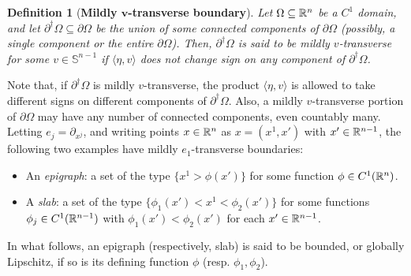 \documentclass[10 pt,a4paper]{article}
\newtheorem{definition}{Definition}
\theoremstyle{definition}
\begin{document}
\begin{definition}[\textbf{Mildly $\mathbf{v}$-transverse boundary}]\label{def_mildlytransv}
	Let $\Omega \subseteq \mathbb R^n$ be a $C^1$ domain, and let $\partial^\dagger\Omega \subseteq \partial \Omega$ be the union of some connected components of $\partial \Omega$ (possibly, a single component or the entire $\partial \Omega$). Then, $\partial^\dagger \Omega$ is said to be \emph{mildly $v$-transverse} for some $v \in \mathbb{S}^{n-1}$ if $\langle \eta,v \rangle$ does not change sign on any component of $\partial^\dagger\Omega$.
\end{definition}

Note that, if $\partial^\dagger \Omega$ is mildly $v$-transverse, the product $\langle \eta,v \rangle$ is allowed to take different signs on different components of $\partial^\dagger \Omega$. Also, a mildly $v$-transverse portion of $\partial\Omega$ may have any number of connected components, even countably many. Letting $e_j = \partial_{x^j}$, and writing points $x \in \mathbb R^n$ as $x = (x^1,x')$ with $x' \in \mathbb R^{n-1}$, the following two examples have mildly $e_1$-transverse boundaries:
 
\begin{itemize}
	\item An \emph{epigraph}: a set of the type $\{x^1 > \phi(x')\}$ for some function $\phi \in C^1(\mathbb R^n)$.
	\item A \emph{slab}: a set of the type $\{\phi_1(x') < x^1 < \phi_2(x')\}$ for some functions $\phi_j \in C^1(\mathbb R^{n-1})$ with $\phi_1(x') < \phi_2(x')$ for each $x' \in \mathbb R^{n-1}$.
\end{itemize}
In what follows, an epigraph (respectively, slab) is said to be bounded, or globally Lipschitz, if so is its defining function $\phi$ (resp. $\phi_1,\phi_2$). 

\vspace{0.3cm} 
\end{document}
